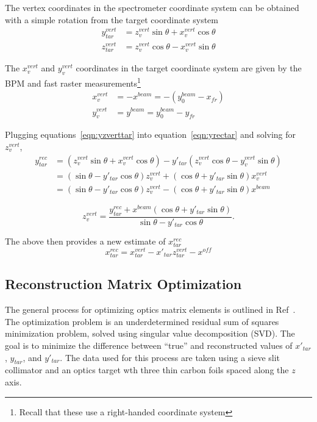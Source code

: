 The vertex coordinates in the spectrometer coordinate system can be obtained
with a simple rotation from the target coordinate system
\begin{align} \label{eqn:yzverttar}
    y^{vert}_{tar} &= z^{vert}_v \sin\theta + x^{vert}_v \cos\theta \\
    z^{vert}_{tar} &= z^{vert}_v \cos\theta - x^{vert}_v \sin\theta
\end{align}

The $x^{vert}_{v}$ and $y^{vert}_{v}$ coordinates in the
target coordinate system are given by the BPM and fast raster
measurements\footnote{Recall that these use a right-handed coordinate system}
\begin{align}
    x^{vert}_v &= -x^{beam} = -(y_0^{beam} - x_{fr}) \\
    y^{vert}_v &= y^{beam} = y_0^{beam} - y_{fr}
\end{align}

Plugging equations~\ref{eqn:yzverttar} into equation~\ref{eqn:yrectar} and
solving for $z^{vert}_v$,
\begin{align}
    y^{rec}_{tar} &= (z^{vert}_v \sin\theta + x^{vert}_v \cos\theta) -
                     y'_{tar} (z^{vert}_v \cos\theta - y^{vert}_v \sin\theta) \\
                  &= (\sin\theta-y'_{tar}\cos\theta)z^{vert}_v +
                     (\cos\theta + y'_{tar} \sin\theta) x^{vert}_v \\
                  &= (\sin\theta-y'_{tar}\cos\theta)z^{vert}_v -
                     (\cos\theta + y'_{tar} \sin\theta) x^{beam}
\end{align}

\begin{equation}
    z^{vert}_v = \frac{y^{rec}_{tar} + x^{beam} (\cos\theta + y'_{tar} \sin\theta)}
                      {\sin\theta - y'_{tar}\cos\theta}.
\end{equation}

The above then provides a new estimate of $x^{rec}_{tar}$
\begin{equation}
    x^{rec}_{tar} = x^{vert}_{tar} - x'_{tar}z^{vert}_{tar} - x^{off}
\end{equation}

\subsection{Reconstruction Matrix Optimization}
The general process for optimizing optics matrix elements is outlined in
Ref~\cite{Bericic_2017}.
The optimization problem is an underdetermined residual sum of squares
minimization problem, solved using singular value decomposition (SVD).
The goal is to minimize the difference between ``true'' and reconstructed
values of $x'_{tar}$, $y_{tar}$, and $y'_{tar}$.
The data used for this process are taken using a sieve slit collimator and
an optics target wth three thin carbon foils spaced along the $z$ axis.


